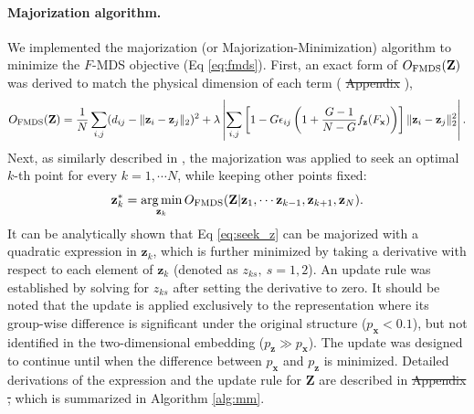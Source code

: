 \documentclass[10pt,letterpaper]{article}
\DeclareMathOperator*{\argmin}{arg\,min}
\newcommand{\1}{{\rm 1}\kern-0.24em{\rm I}}
\providecommand{\DIFaddtex}[1]{{\protect\color{blue}\uwave{#1}}} %
\providecommand{\DIFdeltex}[1]{{\protect\color{red}\sout{#1}}}                      %
\providecommand{\DIFaddbegin}{} %
\providecommand{\DIFaddend}{} %
\providecommand{\DIFdelbegin}{} %
\providecommand{\DIFdelend}{} %
\providecommand{\DIFadd}[1]{\texorpdfstring{\DIFaddtex{#1}}{#1}} %
\providecommand{\DIFdel}[1]{\texorpdfstring{\DIFdeltex{#1}}{}} %
\newcommand{\DIFscaledelfig}{0.5}
\newlength{\DIFdelgraphicswidth} %
\newlength{\DIFdelgraphicsheight} %
\newcommand{\DIFaddincludegraphics}[2][]{{\color{blue}\fbox{\DIFOincludegraphics[#1]{#2}}}} %
\newcommand{\DIFdelincludegraphics}[2][]{%
\sbox{\DIFdelgraphicsbox}{\DIFOincludegraphics[#1]{#2}}%
\settoboxwidth{\DIFdelgraphicswidth}{\DIFdelgraphicsbox} %
\settoboxtotalheight{\DIFdelgraphicsheight}{\DIFdelgraphicsbox} %
\scalebox{\DIFscaledelfig}{%
\parbox[b]{\DIFdelgraphicswidth}{\usebox{\DIFdelgraphicsbox}\\[-\baselineskip] \rule{\DIFdelgraphicswidth}{0em}}\llap{\resizebox{\DIFdelgraphicswidth}{\DIFdelgraphicsheight}{%
\setlength{\unitlength}{\DIFdelgraphicswidth}%
\begin{picture}(1,1)%
\thicklines\linethickness{2pt} %
{\color[rgb]{1,0,0}\put(0,0){\framebox(1,1){}}}%
{\color[rgb]{1,0,0}\put(0,0){\line( 1,1){1}}}%
{\color[rgb]{1,0,0}\put(0,1){\line(1,-1){1}}}%
\end{picture}%
}\hspace*{3pt}}} %
} %
\DeclareRobustCommand{\DIFaddbegin}{\DIFOaddbegin \let\includegraphics\DIFaddincludegraphics} %
\DeclareRobustCommand{\DIFaddend}{\DIFOaddend \let\includegraphics\DIFOincludegraphics} %
\DeclareRobustCommand{\DIFdelbegin}{\DIFOdelbegin \let\includegraphics\DIFdelincludegraphics} %
\DeclareRobustCommand{\DIFdelend}{\DIFOaddend \let\includegraphics\DIFOincludegraphics} %
\begin{document}
\paragraph*{Majorization algorithm.}
We implemented the majorization (or Majorization-Minimization) algorithm to minimize the $F$-MDS objective (Eq \ref{eq:fmds}). First, an exact form of $O_{\rm FMDS}(\mathbf{Z})$ was derived to match the physical dimension of each term (\DIFdelbegin %
\DIFdel{Appendix }\DIFdelend \DIFaddbegin \DIFadd{Appendix A, } \DIFadd{File}\DIFaddend ),
\begin{equation}
    O_{\rm FMDS}(\mathbf{Z}) = \frac{1}{N}\sum_{i,j} (d_{ij} - \| \mathbf{z}_i - \mathbf{z}_j \|_2 )^2 + \lambda\left|\sum_{i,j} \left[1- G\epsilon_{ij} \left(1+\frac{G-1}{N-G}f_\mathbf{z}(F_\mathbf{x})\right)\right] \|\mathbf{z}_i - \mathbf{z}_j\|_2^2\right|.
\end{equation}
Next, as similarly described in \cite{borg05c, witten11}, the majorization was applied to seek an optimal $k$-th point for every $k=1,\cdots N$, while keeping other points fixed:
\begin{equation}
    \mathbf{z}_k^* = \argmin_{\mathbf{z}_k}O_{\rm FMDS}(\mathbf{Z} | \mathbf{z}_1,\cdots \mathbf{z}_{k-1}, \mathbf{z}_{k+1}, \mathbf{z}_N).
    \label{eq:seek_z}
\end{equation}
It can be analytically shown that Eq \ref{eq:seek_z} can be majorized with a quadratic expression in $\mathbf{z}_k$, which is further minimized by taking a derivative with respect to each element of $\mathbf{z}_k$ (denoted as ${z}_{ks},\ s=1,2$). An update rule was established by solving for ${z}_{ks}$ after setting the derivative to zero. It should be noted that the update is applied exclusively to the representation where its group-wise difference is significant under the original structure ($p_\mathbf{x} < 0.1$), but not identified in the two-dimensional embedding ($p_\mathbf{z}\gg p_\mathbf{x}$). The update was designed to continue until when the difference between $p_\mathbf{x}$ and $p_\mathbf{z}$ is minimized. Detailed derivations of the expression and the update rule for $\mathbf{Z}$ are described in \DIFdelbegin %
\DIFdel{Appendix , }\DIFdelend \DIFaddbegin \DIFadd{Appendix B, } \DIFadd{File, }\DIFaddend which is summarized in Algorithm \ref{alg:mm}.
\end{document}
